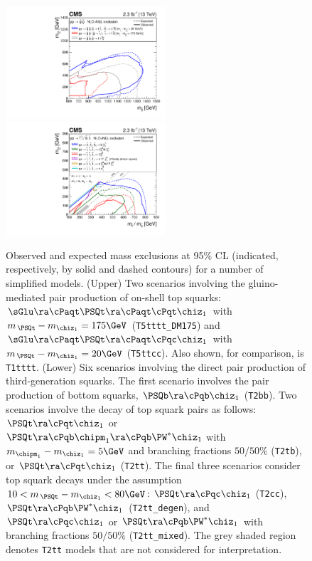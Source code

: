 \begin{figure}[h!]
  \begin{center}
    \includegraphics[width=0.53\textwidth]{figures/limits/v4/naturalWT1SUMMARY.pdf}
    \includegraphics[width=0.53\textwidth]{figures/limits/v4/allThirdGenSUMMARY.pdf} 
    \caption{ Observed and expected mass exclusions at 95\% CL
      (indicated, respectively, by solid and dashed contours) for a
      number of simplified models. (Upper) Two scenarios involving the
      gluino-mediated pair production of on-shell top squarks:
      $\sGlu\ra\cPaqt\PSQt\ra\cPaqt\cPqt\chiz_1$ with $m_{\,\PSQt} -
      m_{\chiz_1} = 175\GeV$ (\texttt{T5tttt\_DM175}) and
      $\sGlu\ra\cPaqt\PSQt\ra\cPaqt\cPqc\chiz_1$ with $m_{\,\PSQt} -
      m_{\chiz_1} = 20\GeV$ (\texttt{T5ttcc}). Also shown, for
      comparison, is \texttt{T1tttt}. (Lower) Six scenarios involving
      the direct pair production of third-generation squarks. The
      first scenario involves the pair production of bottom squarks,
      $\PSQb\ra\cPqb\chiz_1$ (\texttt{T2bb}). Two scenarios involve
      the decay of top squark pairs as follows: $\PSQt\ra\cPqt\chiz_1$
      or $\PSQt\ra\cPqb\chipm_1\ra\cPqb\PW^*\chiz_1$ with
      $m_{\chipm_1} - m_{\chiz_1} = 5\GeV$ and branching fractions
      $50/50\%$ (\texttt{T2tb}), or $\PSQt\ra\cPqt\chiz_1$
      (\texttt{T2tt}). The final three scenarios consider top squark
      decays under the assumption $10 < m_{\,\PSQt} - m_{\chiz_1} <
      80\GeV$: $\PSQt\ra\cPqc\chiz_1$ (\texttt{T2cc}),
      $\PSQt\ra\cPqb\PW^*\chiz_1$ (\texttt{T2tt\_degen}), and
      $\PSQt\ra\cPqc\chiz_1$ or $\PSQt\ra\cPqb\PW^*\chiz_1$ with
      branching fractions $50/50\%$ (\texttt{T2tt\_mixed}). The grey
      shaded region denotes \texttt{T2tt} models that are not
      considered for interpretation. }
    \label{fig:limits-sms-2} 
  \end{center} 
\end{figure}

